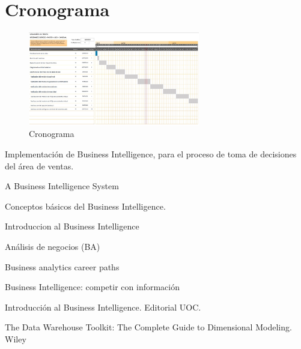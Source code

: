 \documentclass[twoside,twocolumn]{article}
\begin{document}
\section{Cronograma}
\begin{figure}[htb]
	\begin{center}
		\includegraphics[width=7.5cm]{./IMAGENES/Cronograma} 
		\caption{Cronograma}
	\end{center}
\end{figure}





\begin{thebibliography}{99} 

\newblock Implementación de Business Intelligence, para el proceso de toma de decisiones del área de ventas.

\newblock A Business Intelligence System

Conceptos básicos del Business Intelligence.

\newblock Introduccion al Business Intelligence

\newblock Análisis de negocios (BA)

\newblock Business analytics career paths

\newblock Business Intelligence: competir con información


\bibitem[Curto J., 2010]{} 
\newblock Introducción al Business Intelligence. Editorial UOC.

\newblock  The Data Warehouse Toolkit: The Complete Guide to Dimensional Modeling. Wiley
 
\end{thebibliography}


\end{document}
